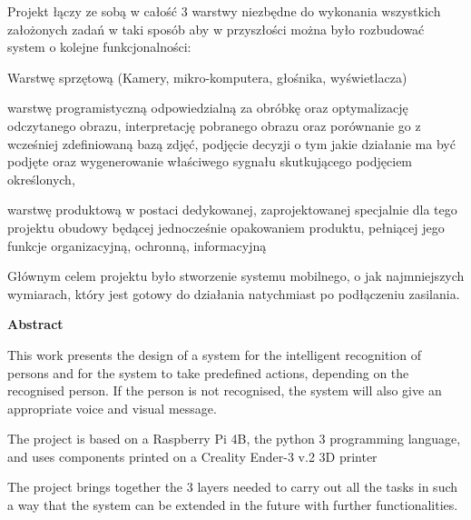 \documentclass[a4paper,12pt,reqno]{article}
\begin{document}
Projekt łączy ze sobą w całość 3 warstwy niezbędne do wykonania wszystkich założonych zadań w taki sposób aby w przyszłości można było rozbudować system o kolejne funkcjonalności:

Warstwę sprzętową (Kamery, mikro-komputera, głośnika, wyświetlacza)

warstwę programistyczną odpowiedzialną za obróbkę oraz optymalizację odczytanego obrazu, interpretację pobranego obrazu oraz porównanie go z wcześniej zdefiniowaną bazą zdjęć, podjęcie decyzji o tym jakie działanie ma być podjęte oraz wygenerowanie właściwego sygnału skutkującego podjęciem określonych,

warstwę produktową w postaci dedykowanej, zaprojektowanej specjalnie dla tego projektu obudowy będącej jednocześnie opakowaniem produktu, pełniącej jego funkcje organizacyjną, ochronną, informacyjną

Głównym celem projektu było stworzenie systemu mobilnego, o jak najmniejszych wymiarach, który jest gotowy do działania natychmiast po podłączeniu zasilania.

%
%
\newpage
\begin{flushleft}
\Large \textbf{Abstract}
\end{flushleft}
\vspace{1cm}

This work presents the design of a system for the intelligent recognition of persons and for the system to take predefined actions, depending on the recognised person. If the person is not recognised, the system will also give an appropriate voice and visual message.

The project is based on a Raspberry Pi 4B, the python 3 programming language, and uses components printed on a Creality Ender-3 v.2 3D printer

The project brings together the 3 layers needed to carry out all the tasks in such a way that the system can be extended in the future with further functionalities.
\end{document}
